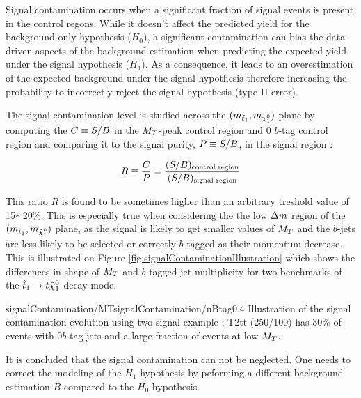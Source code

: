         Signal contamination occurs when a significant fraction of signal events is present in
        the control regons. While it doesn't affect the predicted yield for the background-only hypothesis
        ($H_0$), a significant contamination can bias the data-driven aspects of the background
        estimation when predicting the expected yield under the signal hypothesis ($H_1$). As a
        consequence, it leads to an overestimation of the expected background under the signal hypothesis
        therefore increasing the probability to incorrectly reject the signal hypothesis (type II error).
        
        The signal contamination level is studied across the $(m_{\tilde{t}_1},m_{\tilde{\chi}_1^0})$
        plane by computing the $C \equiv S/B$ in the $M_T$-peak control region and 0 $b$-tag
        control region and comparing it to the signal purity, $P \equiv S/B$, in the signal region :

        \begin{equation}
            R \equiv \frac{C}{P} = \frac{(S/B)_\text{control region}}{(S/B)_\text{signal region}}
            \label{eq:contaminationRatio}
        \end{equation}
      
        This ratio $R$ is found to be sometimes higher than an arbitrary treshold value of 15$\sim$20\%.
        This is especially true when considering the the low $\Delta m$ region of the $(m_{\tilde{t}_1},
        m_{\tilde{\chi}_1^0})$ plane, as the signal is likely to get smaller values of $M_T$ and the $b$-jets
        are less likely to be selected or correctly $b$-tagged as their momentum decrease. This is illustrated
        on Figure \ref{fig:signalContaminationIllustration} which shows the differences in shape of $M_T$ and
        $b$-tagged jet multiplicity for two benchmarks of the $\tilde{t}_1 \rightarrow t \tilde{\chi}_1^0$ decay mode.

                         {signalContamination/MT}{signalContamination/nBtag}{0.4}
                         {Illustration of the signal contamination evolution using two signal example : 
                         T2tt (250/100) has 30\% of events with 0$b$-tag jets and a large fraction of events at low $M_T$.}
    
        It is concluded that the signal contamination can not be neglected. One needs to correct the modeling
        of the $H_1$ hypothesis by peforming a different background estimation $\tilde{B}$ compared to the 
        $H_0$ hypothesis.

